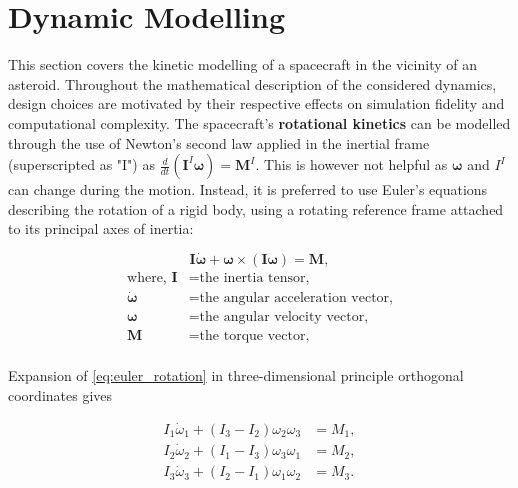 \chapter{Dynamic Modelling}\label{chap:dynamic_modelling}

This section covers the kinetic modelling of a spacecraft in the vicinity of an asteroid. Throughout the mathematical description of the considered dynamics, design choices are motivated by their respective effects on simulation fidelity and computational complexity. The spacecraft's \textbf{rotational kinetics} can be modelled through the use of Newton's second law applied in the inertial frame (superscripted as "I") as $\frac{d}{dt}(\mathbf{I}^I\mathbf{\omega})=\mathbf{M}^I$. This is however not helpful as $\mathbf{\omega}$ and $I^I$ can change during the motion. Instead, it is preferred to use Euler's equations describing the rotation of a rigid body, using a rotating reference frame attached to its principal axes of inertia:

\begin{equation}
{\displaystyle \mathbf {I} {\dot {\boldsymbol {\omega }}}+{\boldsymbol {\omega }}\times \left(\mathbf {I} {\boldsymbol {\omega }}\right)=\mathbf {M},}
    \label{eq:euler_rotation}
\end{equation}
\begin{equation*}
    \begin{aligned}
        \textrm{where, }
        \mathbf{I} &= \textrm{the inertia tensor,}\\
        \dot{\mathbf{\omega}} &= \textrm{the angular acceleration vector,}\\
        \mathbf{\omega} &= \textrm{the angular velocity vector,}\\
        \mathbf{M} &= \textrm{the torque vector,}\\
    \end{aligned}
\end{equation*}

Expansion of \autoref{eq:euler_rotation} in three-dimensional principle orthogonal coordinates gives

\begin{equation}
{\begin{aligned}
     I_{1}{\dot  {\omega }}_{{1}}+(I_{3}-I_{2})\omega _{2}\omega _{3}&=M_{{1}},\\I_{2}{\dot  {\omega }}_{{2}}+(I_{1}-I_{3})\omega _{3}\omega _{1}&=M_{{2}},\\I_{3}{\dot  {\omega }}_{{3}}+(I_{2}-I_{1})\omega _{1}\omega _{2}&=M_{{3}}.
\end{aligned}}
\end{equation}

